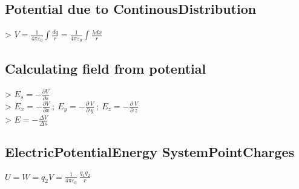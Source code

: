 \subsection*{Potential due to ContinousDistribution}
> $V=\frac{1}{4\pi \varepsilon _0}\int \frac{dq}{r}=\frac{1}{4\pi \varepsilon _0}\int \frac{\lambda dx}{r}$\\
\subsection*{Calculating field from potential}
> $E_s=-\frac{\partial V}{\partial s}$\\
> $E_x=-\frac{\partial V}{\partial x}\:;\:E_y=-\frac{\partial \:V}{\partial \:y}\:;\:E_z=-\frac{\partial \:V}{\partial \:z}$\\
> $E=-\frac{\Delta V}{\Delta s}$\\
\subsection*{ElectricPotentialEnergy SystemPointCharges}
$U=W=q_2V=\frac{1}{4\pi \varepsilon _0}\:\frac{q_1q_2}{r}$\\
